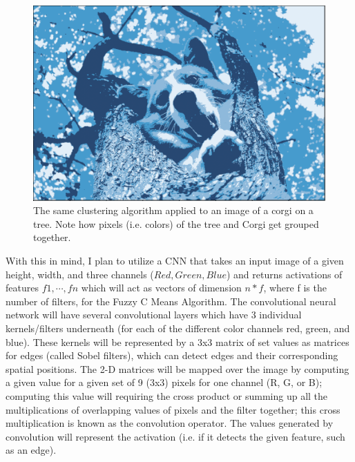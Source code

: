 \documentclass[10pt,twocolumn]{article}
\begin{document}
\begin{figure}[h]
 \centering
 \includegraphics[scale=0.2]{corgi-tree.png}
 \vspace{20px}
 \caption{The same clustering algorithm applied to an image of a corgi on a tree. Note how pixels (i.e. colors) of the tree and Corgi get grouped together.}
 \label{corgi:tree}
\end{figure}


With this in mind, I plan to utilize a CNN that takes an input image of a given height, width, and three channels (\(Red, Green, Blue\)) and returns activations of features \( {f1, \cdots, fn} \) which will act as vectors of dimension \(n * f\), where f is the number of filters, for the Fuzzy C Means Algorithm. The convolutional neural network will have several convolutional layers which have 3 individual kernels/filters underneath (for each of the different color channels red, green, and blue). These kernels will be represented by a 3x3 matrix of set values as matrices for edges (called Sobel filters), which can detect edges and their corresponding spatial positions. The 2-D matrices will be mapped over the image by computing a given value for a given set of 9 (3x3) pixels for one channel (R, G, or B); computing this value will requiring the cross product or summing up all the multiplications of overlapping values of pixels and the filter together; this cross multiplication is known as the convolution operator. The values generated by convolution will represent the activation (i.e. if it detects the given feature, such as an edge). 

\end{document}
